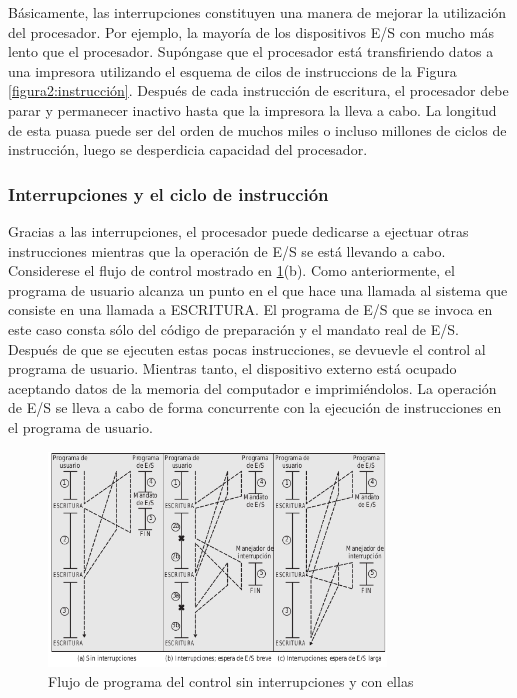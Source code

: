 \documentclass{article}
\begin{document}
				Básicamente, las interrupciones constituyen una manera de mejorar la utilización del procesador. Por ejemplo, la mayoría de los dispositivos E/S con mucho más lento que el procesador. Supóngase que el procesador está transfiriendo datos a una impresora utilizando el esquema de cilos de instruccions de la Figura \ref{figura2:instrucción}. Después de cada instrucción de escritura, el procesador debe parar y permanecer inactivo hasta que la impresora la lleva a cabo. La longitud de esta puasa puede ser del orden de muchos miles o incluso millones de ciclos de instrucción, luego se desperdicia capacidad del procesador.
				
				\subsubsection{Interrupciones y el ciclo de instrucción}
					Gracias a las interrupciones, el procesador puede dedicarse a ejectuar otras instrucciones mientras que la operación de E/S se está llevando a cabo. Considerese el flujo de control mostrado en \ref{figura5:flujo_programa}(b). Como anteriormente, el programa de usuario alcanza un punto en el que hace una llamada al sistema que consiste en una llamada a ESCRITURA. El programa de E/S que se invoca en este caso consta sólo del código de preparación y el mandato real de E/S. Después de que se ejecuten estas pocas instrucciones, se devuevle el control al programa de usuario. Mientras tanto, el dispositivo externo está ocupado aceptando datos de la memoria del computador e imprimiéndolos. La operación de E/S se lleva a cabo de forma concurrente con la ejecución de instrucciones en el programa de usuario. \\
					
					\begin{figure}
						\caption{Flujo de programa del control sin interrupciones y con ellas}
						\label{figura5:flujo_programa}
						\centering
						\includegraphics[width=0.8\textwidth, scale=1]{figura5.png}
					\end{figure}
\end{document}
